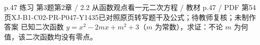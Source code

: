 \par\noindent\begin{minipage}{\linewidth}
\begin{bankitem}{p.47 练习 第3题}{第2章 / 2.2 从函数观点看一元二次方程 / 教材 p.47 / PDF 第54页}{XJ-B1-C02-PR-P047-Y1435}{已对照原页转写题干及公式；待教师复核；未制作答案}
已知二次函数 $y=x^2-2mx+m^2+3$（$m$ 为常数），求证：不论 $m$ 为何值，该二次函数均没有零点。
\end{bankitem}
\end{minipage}\par\medskip
